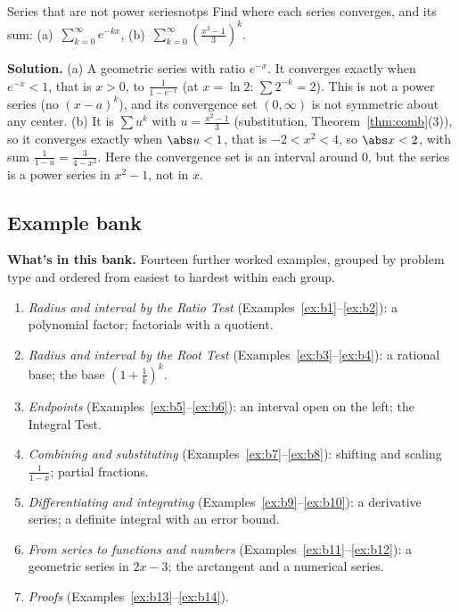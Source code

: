 \documentclass[11pt]{article}
\begin{document}
\begin{exmp}{Series that are not power series}{notps}
Find where each series converges, and its sum: (a)~$\sum_{k=0}^\infty e^{-kx}$, (b)~$\sum_{k=0}^\infty\left(\frac{x^2-1}3\right)^k$.

\textbf{Solution.} (a) A geometric series with ratio $e^{-x}$. It converges exactly when $e^{-x}<1$, that is $x>0$, to $\frac1{1-e^{-x}}$ (at $x=\ln2$: $\sum2^{-k}=2$). This is not a power series (no $(x-a)^k$), and its convergence set $(0,\infty)$ is not symmetric about any center. (b) It is $\sum u^k$ with $u=\frac{x^2-1}3$ (substitution, Theorem~\ref{thm:comb}(3)), so it converges exactly when $\abs u<1$, that is $-2<x^2<4$, so $\abs x<2$, with sum $\frac1{1-u}=\frac3{4-x^2}$. Here the convergence set is an interval around $0$, but the series is a power series in $x^2-1$, not in $x$.
\end{exmp}

\subsection*{Example bank}

\textbf{What's in this bank.} Fourteen further worked examples, grouped by problem type and ordered from easiest to hardest within each group.
\begin{enumerate}[nosep]
  \item \emph{Radius and interval by the Ratio Test} (Examples~\ref{ex:b1}--\ref{ex:b2}): a polynomial factor; factorials with a quotient.
  \item \emph{Radius and interval by the Root Test} (Examples~\ref{ex:b3}--\ref{ex:b4}): a rational base; the base $(1+\frac1k)^k$.
  \item \emph{Endpoints} (Examples~\ref{ex:b5}--\ref{ex:b6}): an interval open on the left; the Integral Test.
  \item \emph{Combining and substituting} (Examples~\ref{ex:b7}--\ref{ex:b8}): shifting and scaling $\frac1{1-x}$; partial fractions.
  \item \emph{Differentiating and integrating} (Examples~\ref{ex:b9}--\ref{ex:b10}): a derivative series; a definite integral with an error bound.
  \item \emph{From series to functions and numbers} (Examples~\ref{ex:b11}--\ref{ex:b12}): a geometric series in $2x-3$; the arctangent and a numerical series.
  \item \emph{Proofs} (Examples~\ref{ex:b13}--\ref{ex:b14}).
\end{enumerate}
\end{document}
